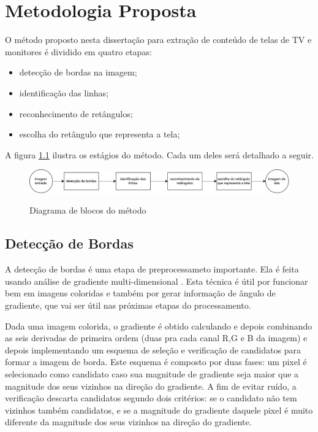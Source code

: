 \chapter{Metodologia Proposta}

O método proposto nesta dissertação para extração de conteúdo de telas de TV e monitores é dividido em quatro etapas:

\begin{itemize}
 \item detecção de bordas na imagem;
 \item identificação das linhas;
 \item reconhecimento de retângulos;
 \item escolha do retângulo que representa a tela;
\end{itemize}

A figura \ref{diag} ilustra os estágios do método. Cada um deles será detalhado a seguir.


\begin{figure} [h]
\includegraphics[width = \textwidth]{figuras/diag.pdf} \label{diag} \caption{Diagrama de blocos do método}
\end{figure} 

\section{Detecção de Bordas}


A detecção de bordas é uma etapa de preprocessameto importante. Ela é feita usando análise de gradiente multi-dimensional \cite{borda00}. Esta técnica é útil por funcionar bem em imagens coloridas e também por gerar informação de ângulo de gradiente, que vai ser útil nas próximas etapas do processamento.

Dada uma imagem colorida, o gradiente é obtido calculando e depois combinando as seis derivadas de primeira ordem (duas pra cada canal R,G e B da imagem) e depois implementando um esquema de seleção e verificação de candidatos para formar a imagem de borda. Este esquema é composto por duas fases: um pixel é selecionado como candidato caso sua magnitude de gradiente seja maior que a magnitude dos seus vizinhos na direção do gradiente. A fim de evitar ruído, a verificação descarta candidatos segundo dois critérios: se o candidato não tem vizinhos também candidatos, e se a magnitude do gradiente daquele pixel é muito diferente da magnitude dos seus vizinhos na direção do gradiente.


